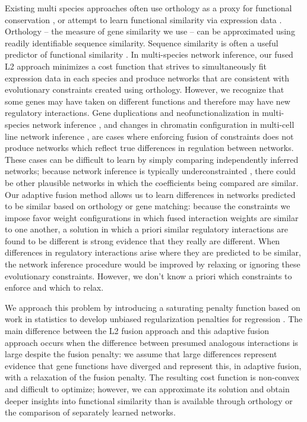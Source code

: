\documentclass[11pt]{article}
\begin{document}
Existing multi species approaches often use orthology as a proxy for functional conservation \cite{penfold_inferring_2015, joshi_multi-species_2015, kashima_simultaneous_2009, zhang2010nearly}, or attempt to learn functional similarity via expression data \cite{gholami_cross-species_2010}. Orthology -- the measure of gene similarity we use -- can be approximated using readily identifiable sequence similarity. Sequence similarity is often a useful predictor of functional similarity \cite{wilson_assessing_2000}. In multi-species network inference, our fused L2 approach minimizes a cost function that strives to simultaneously fit expression data in each species and produce networks that are consistent with evolutionary constraints created using orthology. However, we recognize that some genes may have taken on different functions and therefore may have new regulatory interactions. Gene duplications and neofunctionalization in multi-species network inference \cite{eisen_phylogenomics:_1998}, and changes in chromatin configuration in multi-cell line network inference \cite{li_role_2007}, are cases where enforcing fusion of constraints does not produce networks which reflect true differences in regulation between networks. These cases can be difficult to learn by simply comparing independently inferred networks; because network inference is typically underconstrainted \cite{marbach_revealing_2010-1}, there could be other plausible networks in which the coefficients being compared are similar. Our adaptive fusion method allows us to learn differences in networks predicted to be similar based on orthology or gene matching: because the constraints we impose favor weight configurations in which fused interaction weights are similar to one another, a solution in which a priori similar regulatory interactions are found to be different is strong evidence that they really are different. When differences in regulatory interactions arise where they are predicted to be similar, the network inference procedure would be improved by relaxing or ignoring these evolutionary constraints. However, we don't know a priori which constraints to enforce and which to relax. 

We approach this problem by introducing a saturating penalty function based on work in statistics to develop unbiased regularization penalties for regression \cite{zhang2010nearly, fan2001variable}. The main difference between the L2 fusion approach and this adaptive fusion approach occurs when the difference between presumed analogous interactions is large despite the fusion penalty: we assume that large differences represent evidence that gene functions have diverged and represent this, in adaptive fusion, with a relaxation of the fusion penalty. The resulting cost function is non-convex and difficult to optimize; however, we can approximate its solution and obtain deeper insights into functional similarity than is available through orthology or the comparison of separately learned networks. 
\end{document}
